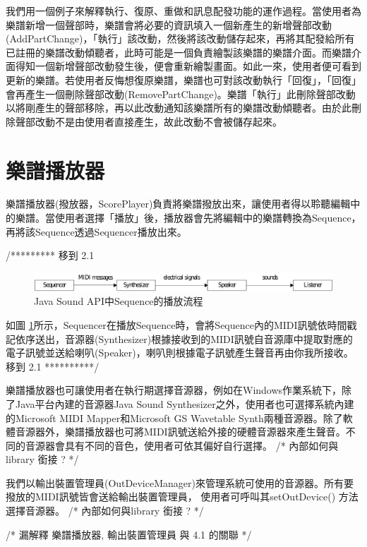\documentclass[12pt,a4paper,oneside]{report}
\begin{document}
我們用一個例子來解釋執行、復原、重做和訊息配發功能的運作過程。當使用者為樂譜新增一個聲部時，樂譜會將必要的資訊填入一個新產生的新增聲部改動(AddPartChange)，「執行」該改動，然後將該改動儲存起來，再將其配發給所有已註冊的樂譜改動傾聽者，此時可能是一個負責繪製該樂譜的樂譜介面。而樂譜介面得知一個新增聲部改動發生後，便會重新繪製畫面。如此一來，使用者便可看到更新的樂譜。若使用者反悔想復原樂譜，樂譜也可對該改動執行「回復」，「回復」會再產生一個刪除聲部改動(RemovePartChange)。樂譜「執行」此刪除聲部改動以將剛產生的聲部移除，再以此改動通知該樂譜所有的樂譜改動傾聽者。由於此刪除聲部改動不是由使用者直接產生，故此改動不會被儲存起來。

\section{樂譜播放器}

樂譜播放器(撥放器，ScorePlayer)負責將樂譜撥放出來，讓使用者得以聆聽編輯中的樂譜。當使用者選擇「播放」後，播放器會先將編輯中的樂譜轉換為Sequence，再將該Sequence透過Sequencer播放出來。

/*********  移到 2.1 


\begin{figure}[htb]
\centering
\includegraphics[scale=0.12]{img/play.png}
\caption{ Java Sound API中Sequence的播放流程 }
\label{fig:play}
\end{figure}


如圖 \ref{fig:play}所示，Sequencer在播放Sequence時，會將Sequence內的MIDI訊號依時間戳記依序送出，音源器(Synthesizer)根據接收到的MIDI訊號自音源庫中提取對應的電子訊號並送給喇叭(Speaker)，喇叭則根據電子訊號產生聲音再由你我所接收。
移到 2.1    **********/ 


樂譜播放器也可讓使用者在執行期選擇音源器，例如在Windows作業系統下，除了Java平台內建的音源器Java Sound Synthesizer之外，使用者也可選擇系統內建的Microsoft MIDI Mapper和Microsoft GS Wavetable Synth兩種音源器。除了軟體音源器外，樂譜播放器也可將MIDI訊號送給外接的硬體音源器來產生聲音。不同的音源器會具有不同的音色，使用者可依其偏好自行選擇。 /* 內部如何與library 銜接 ?  */

我們以輸出裝置管理員(OutDeviceManager)來管理系統可使用的音源器。所有要撥放的MIDI訊號皆會送給輸出裝置管理員， 使用者可呼叫其setOutDevice() 方法選擇音源器。 /* 內部如何與library 銜接 ?  */

/*  漏解釋 樂譜播放器, 輸出裝置管理員 與 4.1 的關聯  */
\end{document}
